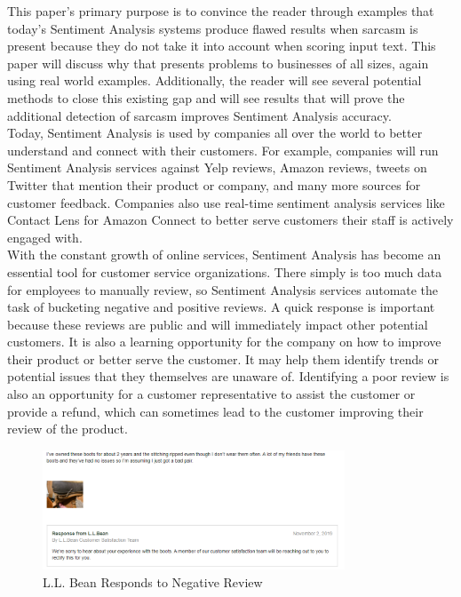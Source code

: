 \documentclass[conference]{IEEEtran}
\begin{document}
This paper’s primary purpose is to convince the reader through examples that today’s Sentiment Analysis systems produce flawed results when sarcasm is present because they do not take it into account when scoring input text. This paper will discuss why that presents problems to businesses of all sizes, again using real world examples. Additionally, the reader will see several potential methods to close this existing gap and will see results that will prove the additional detection of sarcasm improves Sentiment Analysis accuracy. \\
Today, Sentiment Analysis is used by companies all over the world to better understand and connect with their customers. For example, companies will run Sentiment Analysis services against Yelp reviews, Amazon reviews, tweets on Twitter that mention their product or company, and many more sources for customer feedback. Companies also use real-time sentiment analysis services like Contact Lens for Amazon Connect to better serve customers their staff is actively engaged with.\\
With the constant growth of online services, Sentiment Analysis has become an essential tool for customer service organizations.  There simply is too much data for employees to manually review, so Sentiment Analysis services automate the task of bucketing negative and positive reviews. A quick response is important because these reviews are public and will immediately impact other potential customers.  It is also a learning opportunity for the company on how to improve their product or better serve the customer. It may help them identify trends or potential issues that they themselves are unaware of. Identifying a poor review is also an opportunity for a customer representative to assist the customer or provide a refund, which can sometimes lead to the customer improving their review of the product.\\

\begin{figure}[htbp]
\centerline{\includegraphics[width=9cm]{image1.png}}
\caption{L.L. Bean Responds to Negative Review}
\label{fig}
\end{figure}
\end{document}
